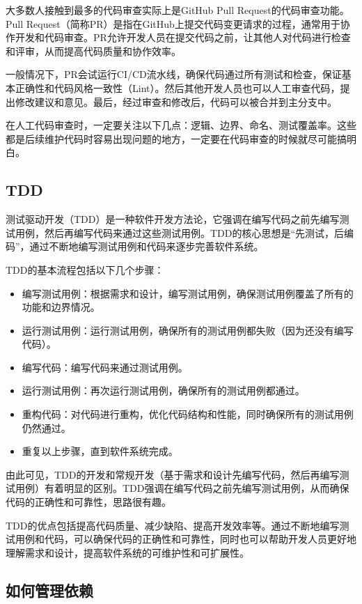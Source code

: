 大多数人接触到最多的代码审查实际上是GitHub Pull Request的代码审查功能。Pull Request（简称PR）是指在GitHub上提交代码变更请求的过程，通常用于协作开发和代码审查。PR允许开发人员在提交代码之前，让其他人对代码进行检查和评审，从而提高代码质量和协作效率。

一般情况下，PR会试运行CI/CD流水线，确保代码通过所有测试和检查，保证基本正确性和代码风格一致性（Lint）。然后其他开发人员也可以人工审查代码，提出修改建议和意见。最后，经过审查和修改后，代码可以被合并到主分支中。

在人工代码审查时，一定要关注以下几点：逻辑、边界、命名、测试覆盖率。这些都是后续维护代码时容易出现问题的地方，一定要在代码审查的时候就尽可能搞明白。

\subsection{TDD}

测试驱动开发（TDD）是一种软件开发方法论，它强调在编写代码之前先编写测试用例，然后再编写代码来通过这些测试用例。TDD的核心思想是“先测试，后编码”，通过不断地编写测试用例和代码来逐步完善软件系统。

TDD的基本流程包括以下几个步骤：
\begin{itemize}
  \item 编写测试用例：根据需求和设计，编写测试用例，确保测试用例覆盖了所有的功能和边界情况。
  \item 运行测试用例：运行测试用例，确保所有的测试用例都失败（因为还没有编写代码）。
  \item 编写代码：编写代码来通过测试用例。
  \item 运行测试用例：再次运行测试用例，确保所有的测试用例都通过。
  \item 重构代码：对代码进行重构，优化代码结构和性能，同时确保所有的测试用例仍然通过。
  \item 重复以上步骤，直到软件系统完成。
\end{itemize}

由此可见，TDD的开发和常规开发（基于需求和设计先编写代码，然后再编写测试用例）有着明显的区别。TDD强调在编写代码之前先编写测试用例，从而确保代码的正确性和可靠性，思路很有趣。

TDD的优点包括提高代码质量、减少缺陷、提高开发效率等。通过不断地编写测试用例和代码，可以确保代码的正确性和可靠性，同时也可以帮助开发人员更好地理解需求和设计，提高软件系统的可维护性和可扩展性。

\subsection{如何管理依赖}

